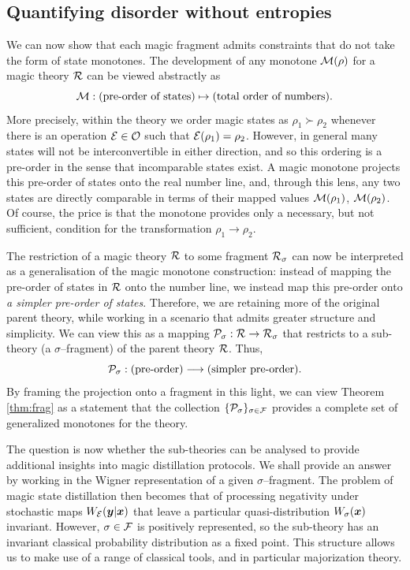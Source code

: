\documentclass[pra,
aps,
twocolumn,
superscriptaddress,
groupedaddress,
nofootinbib,
reprint
]{revtex4-1}
\begin{document}
\subsection{Quantifying disorder without entropies}
\label{sec:major}

We can now show that each magic fragment admits constraints that do not take the form of state monotones. 
The development of any monotone $\M(\rho)$ for a magic theory $\R$ can be viewed abstractly as
\begin{equation}
\M : \mbox{(pre-order of states)} \mapsto \mbox{(total order of numbers).} \nonumber
\end{equation}
More precisely, within the theory we order magic states as $\rho_1 \succ \rho_2$ whenever there is an operation $\E \in \O$ such that $\E(\rho_1) = \rho_2$. However, in general many states will not be interconvertible in either direction, and so this ordering is a pre-order in the sense that incomparable states exist. A magic monotone projects this pre-order of states onto the real number line, and, through this lens, any two states are directly comparable in terms of their mapped values $\M(\rho_1)$, $\M(\rho_2)$. Of course, the price is that the monotone provides only a necessary, but not sufficient, condition for the transformation $\rho_1 \rightarrow \rho_2$.

The restriction of a magic theory $\R$ to some fragment $\R_\sigma$ can now be interpreted as a generalisation of the magic monotone construction: instead of mapping the pre-order of states in $\R$ onto the number line, we instead map this pre-order onto \emph{a simpler pre-order of states}. Therefore, we are retaining more of the original parent theory, while working in a scenario that admits greater structure and simplicity. We can view this as a mapping $\P_\sigma: \R \rightarrow \R_\sigma$ that restricts to a sub-theory (a $\sigma$--fragment) of the parent theory $\R$. Thus,
\begin{equation}
\P_\sigma: \mbox{(pre-order)} \longrightarrow \mbox{(simpler pre-order).}
\end{equation}
By framing the projection onto a fragment in this light, we can view Theorem \ref{thm:frag} as a statement that the collection $\{\P_\sigma\}_{\sigma \in \F}$ provides a complete set of generalized monotones for the theory.

The question is now whether the sub-theories can be analysed to provide additional insights into magic distillation protocols. We shall provide an answer by working in the Wigner representation of a given $\sigma$--fragment. The problem of magic state distillation then becomes that of processing negativity under stochastic maps $W_{\E}( \y |\x)$ that leave a particular quasi-distribution $W_\sigma(\x)$ invariant. However, $\sigma \in \F$ is positively represented, so the sub-theory has an invariant classical probability distribution as a fixed point. This structure allows us to make use of a range of classical tools, and in particular majorization theory.
\end{document}

